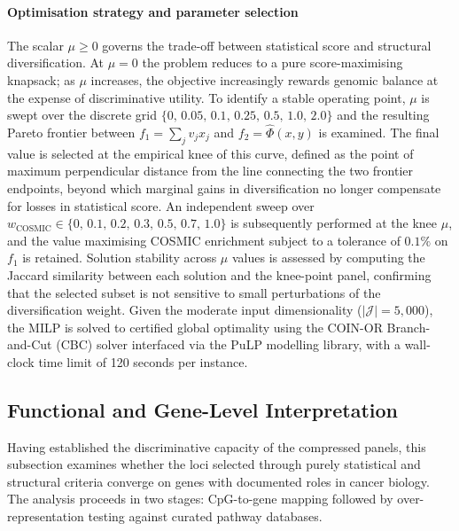 \paragraph{Optimisation strategy and parameter selection}

The scalar $\mu \ge 0$ governs the trade-off between statistical score and
structural diversification. At $\mu = 0$ the problem reduces to a pure
score-maximising knapsack; as $\mu$ increases, the objective increasingly
rewards genomic balance at the expense of discriminative utility. To identify
a stable operating point, $\mu$ is swept over the discrete grid
$\{0,\, 0.05,\, 0.1,\, 0.25,\, 0.5,\, 1.0,\, 2.0\}$ and the resulting
Pareto frontier between $f_1 = \sum_j v_j x_j$ and $f_2 = \hat{\Phi}(x,y)$
is examined. The final value is selected at the empirical knee of this curve,
defined as the point of maximum perpendicular distance from the line connecting
the two frontier endpoints, beyond which marginal gains in diversification no
longer compensate for losses in statistical score. An independent sweep over
$w_{\mathrm{COSMIC}} \in \{0,\, 0.1,\, 0.2,\, 0.3,\, 0.5,\, 0.7,\, 1.0\}$
is subsequently performed at the knee $\mu$, and the value maximising COSMIC
enrichment subject to a tolerance of $0.1\%$ on $f_1$ is retained.
Solution stability across $\mu$ values is assessed by computing the Jaccard
similarity between each solution and the knee-point panel, confirming that the
selected subset is not sensitive to small perturbations of the diversification
weight. Given the moderate input dimensionality ($|\mathcal{J}| = 5{,}000$),
the MILP is solved to certified global optimality using the COIN-OR
Branch-and-Cut (CBC) solver interfaced via the PuLP modelling library, with a
wall-clock time limit of 120 seconds per instance.

\subsection{Functional and Gene-Level Interpretation}
\label{sec:gene_enrichment}

Having established the discriminative capacity of the compressed
panels, this subsection examines whether the loci selected
through purely statistical and structural criteria converge
on genes with documented roles in cancer biology. The analysis
proceeds in two stages: CpG-to-gene mapping followed by
over-representation testing against curated pathway databases.

